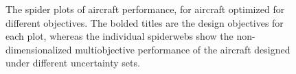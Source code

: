 \begin{figure}
\begin{center}
    \caption{The spider plots of aircraft performance, for aircraft optimized for different objectives.
    The bolded titles are the design objectives for each plot, whereas the individual spiderwebs
    show the non-dimensionalized multiobjective performance of the aircraft designed under different
    uncertainty sets.}
    \label{fig:spider}
\end{center}
\end{figure}

